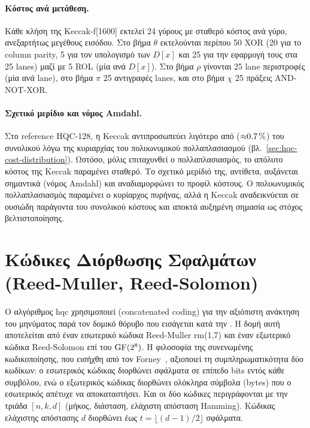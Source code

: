 \paragraph{Κόστος ανά μετάθεση.}
Κάθε κλήση της Keccak-f[1600] εκτελεί 24 γύρους με σταθερό κόστος ανά γύρο, ανεξαρτήτως μεγέθους εισόδου. Στο βήμα $\theta$ εκτελούνται περίπου 50 XOR (20 για το column parity, 5 για τον υπολογισμό των $D[x]$ και 25 για την εφαρμογή τους στα 25 lanes) μαζί με 5 ROL (μία ανά $D[x]$). Στο βήμα $\rho$ γίνονται 25 lane περιστροφές (μία ανά lane), στο βήμα $\pi$ 25 αντιγραφές lanes, και στο βήμα $\chi$ 25 πράξεις AND-NOT-XOR.

\paragraph{Σχετικό μερίδιο και νόμος Amdahl.}
Στο reference HQC-128, η Keccak αντιπροσωπεύει λιγότερο από 
(${\approx}\SI{0.7}{\percent}$) του συνολικού \instret λόγω
της κυριαρχίας του πολυωνυμικού πολλαπλασιασμού
(βλ.~\cref{sec:hqc-cost-distribution}).
Ωστόσο, μόλις επιταχυνθεί ο πολλαπλασιασμός, το απόλυτο κόστος της Keccak παραμένει σταθερό. Το σχετικό μερίδιό της, αντίθετα, αυξάνεται σημαντικά (νόμος Amdahl) και αναδιαμορφώνει το προφίλ κόστους. Ο πολυωνυμικός πολλαπλασιασμός παραμένει ο κυρίαρχος πυρήνας, αλλά η Keccak αναδεικνύεται σε ουσιώδη παράγοντα του συνολικού κόστους και αποκτά αυξημένη σημασία ως στόχος βελτιστοποίησης.


\section{Κώδικες Διόρθωσης Σφαλμάτων (Reed-Muller, Reed-Solomon)}
\label{sec:ecc-theory}

Ο αλγόριθμος \gls{hqc} χρησιμοποιεί 
(concatenated coding) για την αξιόπιστη ανάκτηση του μηνύματος παρά τον δομικό
θόρυβο που εισάγεται κατά την \Encaps. Η δομή αυτή αποτελείται από έναν εσωτερικό 
κώδικα Reed-Muller \gls{rm}(1,7) και έναν εξωτερικό κώδικα Reed-Solomon επί του 
$\mathrm{GF}(2^8)$. Η φιλοσοφία της συνενωμένης κωδικοποίησης, που εισήχθη από τον
Forney~\cite{Forney1966}, αξιοποιεί τη συμπληρωματικότητα δύο κωδίκων:
ο εσωτερικός κώδικας διορθώνει σφάλματα σε επίπεδο bits εντός κάθε συμβόλου,
ενώ ο εξωτερικός κώδικας διορθώνει ολόκληρα σύμβολα (bytes) που ο εσωτερικός
απέτυχε να αποκαταστήσει.
Και οι δύο κώδικες περιγράφονται με την τριάδα $[n, k, d]$ (μήκος, διάσταση,
ελάχιστη απόσταση Hamming). Κώδικας ελάχιστης απόστασης $d$ διορθώνει έως
$t = \lfloor (d-1)/2 \rfloor$ σφάλματα.

